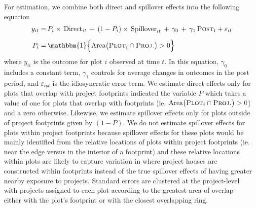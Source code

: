 \documentclass[12pt]{article}
\begin{document}
For estimation, we combine both direct and spillover effects into the following equation
\begin{align}
\label{eq:main}
\begin{split}
\quad y_{it}  =\,& P_i \times \, \text{Direct}_{it} \, + \, (1- P_i) \times \, \text{Spillover}_{it} \,+\, \gamma_0 \,+\, \gamma_1 \, \textsc{Post}_t + \varepsilon_{it} \\[.5em]
P_i =\,& \mathbbm{1}\Big\{\text{Area}\big(\textsc{Plot}_i  \cap  \textsc{Proj.}\big)>0\Big \}\,
\end{split}
\end{align}
\noindent where $y_{it}$ is the outcome for plot $i$ observed at time $t$.  In this equation, $\gamma_0$ includes a constant term, $\gamma_1$ controls for average changes in outcomes in the post period, and $\varepsilon_{ipt}$ is the idiosyncratic error term.  We estimate direct effects only for plots that overlap with project footprints indicated the variable $P$ which takes a value of one for plots that overlap with footprints (ie. $\text{Area}\big(\textsc{Plot}_i  \cap  \textsc{Proj.}\big)>0$) and a zero otherwise.  Likewise, we estimate spillover effects only for plots outside of project footprints given by $(1-P)$.  We do not estimate spillover effects for plots within project footprints because spillover effects for these plots would be mainly identified from the relative locations of plots within project footprints (ie. near the edge versus in the interior of a footprint) and these relative locations within plots are likely to capture variation in where project houses are constructed within footprints instead of the true spillover effects of having greater nearby exposure to projects.  Standard errors are clustered at the project-level with projects assigned to each plot according to the greatest area of overlap either with the plot's footprint or with the closest overlapping ring.
\end{document}
